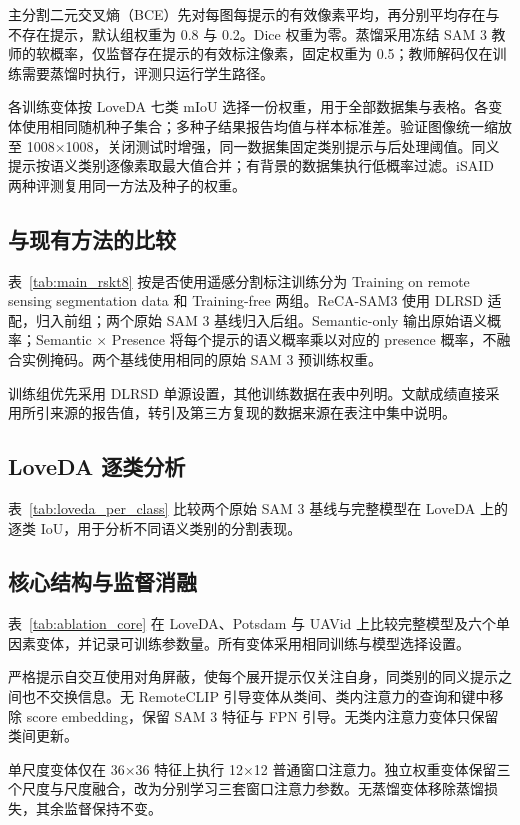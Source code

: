 主分割二元交叉熵（BCE）先对每图每提示的有效像素平均，再分别平均存在与不存在提示，默认组权重为 0.8 与 0.2。Dice 权重为零。蒸馏采用冻结 SAM 3 教师的软概率，仅监督存在提示的有效标注像素，固定权重为 0.5；教师解码仅在训练需要蒸馏时执行，评测只运行学生路径。

各训练变体按 LoveDA 七类 mIoU 选择一份权重，用于全部数据集与表格。各变体使用相同随机种子集合；多种子结果报告均值与样本标准差。验证图像统一缩放至 1008×1008，关闭测试时增强，同一数据集固定类别提示与后处理阈值。同义提示按语义类别逐像素取最大值合并；有背景的数据集执行低概率过滤。iSAID 两种评测复用同一方法及种子的权重。

\subsection{与现有方法的比较}
表~\ref{tab:main_rskt8} 按是否使用遥感分割标注训练分为 Training on remote sensing segmentation data 和 Training-free 两组。ReCA-SAM3 使用 DLRSD 适配，归入前组；两个原始 SAM 3 基线归入后组。Semantic-only 输出原始语义概率；Semantic $\times$ Presence 将每个提示的语义概率乘以对应的 presence 概率，不融合实例掩码。两个基线使用相同的原始 SAM 3 预训练权重。

训练组优先采用 DLRSD 单源设置，其他训练数据在表中列明。文献成绩直接采用所引来源的报告值，转引及第三方复现的数据来源在表注中集中说明。

\subsection{LoveDA 逐类分析}

表~\ref{tab:loveda_per_class} 比较两个原始 SAM 3 基线与完整模型在 LoveDA 上的逐类 IoU，用于分析不同语义类别的分割表现。

\subsection{核心结构与监督消融}

表~\ref{tab:ablation_core} 在 LoveDA、Potsdam 与 UAVid 上比较完整模型及六个单因素变体，并记录可训练参数量。所有变体采用相同训练与模型选择设置。

严格提示自交互使用对角屏蔽，使每个展开提示仅关注自身，同类别的同义提示之间也不交换信息。无 RemoteCLIP 引导变体从类间、类内注意力的查询和键中移除 score embedding，保留 SAM 3 特征与 FPN 引导。无类内注意力变体只保留类间更新。

单尺度变体仅在 36×36 特征上执行 12×12 普通窗口注意力。独立权重变体保留三个尺度与尺度融合，改为分别学习三套窗口注意力参数。无蒸馏变体移除蒸馏损失，其余监督保持不变。

